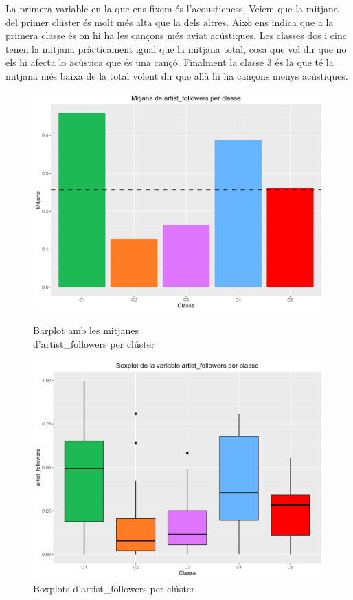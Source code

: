 La primera variable en la que ens fixem és l'acousticness. Veiem que la mitjana del primer clúster és molt més alta que la dels altres. Això ens indica que a la primera classe és on hi ha les cançons més aviat acústiques. Les classes dos i cinc tenen la mitjana pràcticament igual que la mitjana total, cosa que vol dir que no els hi afecta lo acústica que és una cançó. Finalment la classe 3 és la que té la mitjana més baixa de la total volent dir que allà hi ha cançons menys acústiques. 

\begin{figure}[H]
\centering
    \begin{minipage}{.49\textwidth}
        \centering
        \includegraphics[width=0.95\linewidth]{Images/5_Profiling/numeriques/Num_BarPlot_artist_followers.png}
        \caption{Barplot amb les mitjanes \\ d'artist\_followers per clúster}
        \label{fig:Num_BarPlot_artist_followers}
    \end{minipage}%
    \begin{minipage}{.49\textwidth}
        \centering
        \includegraphics[width=0.95\linewidth]{Images/5_Profiling/numeriques/Num_BoxPlot_artist_followers.png}
        \caption{Boxplots d'artist\_followers per clúster}
        \label{fig:Num_BoxPlot_artist_followers}
    \end{minipage}%
\end{figure}

